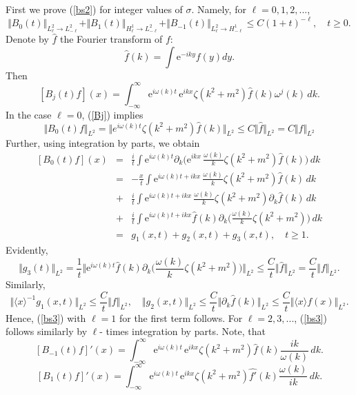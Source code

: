 \documentclass[reqno]{amsart}
\newcommand{\E}{\mathrm{e}}
\numberwithin{equation}{section}
\begin{document}
First we prove (\ref{bs2})  for integer  values of $\sigma$.  Namely, for $\ell=0,1,2,...$,
\begin{equation}\label{bs3}
\Vert B_0(t)\Vert_{L^2_{\ell}\to L^2_{-\ell}}
+\Vert B_1(t)\Vert_{H^1_{\ell}\to L^2_{-\ell}}+\Vert B_{-1}(t)\Vert_{L^2_{\ell}\to H^1_{-\ell}}
\le C(1+t)^{-\ell}\!,  \quad t\ge0.
\end{equation}
Denote by $\hat f$ the Fourier transform of $f$:
\[
\hat f(k)=\int \E^{-iky} f(y)dy.
\]
Then
\begin{equation}\label{Bj}
\!\!\!\!\![B_j(t)f](x)
=\int_{-\infty}^{\infty}\E^{i\omega(k)t}\,\E^{ikx}\zeta(k^2+m^2)\hat f(k)\omega^j(k)\,dk.
\end{equation}
In the case $\ell=0$, (\ref{Bj}) implies
$$
\Vert B_0(t)f\Vert_{L^2}=\Vert e^{i\omega(k)t}\zeta(k^2+m^2)\hat f(k)\Vert_{L^2}
\le C\Vert \hat f\Vert_{L^2} =C\Vert f\Vert_{L^2} 
$$
Further, using integration by parts, we obtain
\begin{eqnarray}\nonumber
[B_0(t)f](x)&\!\!=\!\!&\frac{i}{t}\int \E^{i\omega(k)t}\partial_k\Big(\E^{ikx}\,\frac{\omega(k)}{k}\zeta(k^2+m^2)\hat f(k)\Big)\,dk\\
\nonumber
&\!\!=\!\!&-\frac{x}{t}\int \E^{i\omega(k)t+ikx}\,\frac{\omega(k)}{k}\zeta(k^2+m^2)\hat f(k)\,dk\\
\nonumber
&\!\!+\!\!&\frac{i}{t}\int \E^{i\omega(k)t+ikx}\,\frac{\omega(k)}{k}\zeta(k^2+m^2)\partial_k\hat f(k)\,dk\\
\nonumber
&\!\!+\!\!&\frac{i}{t}\int \E^{i\omega(k)t+ikx}\hat f(k)\partial_k\Big(\frac{\omega(k)}{k}\zeta(k^2+m^2)\Big)\,dk\\
\label{in1}
&=&g_1(x,t)+g_2(x,t)+g_3(x,t),\quad t\ge 1.
\end{eqnarray}
Evidently,
$$
\Vert g_3(t)\Vert_{L^2}=\frac{1}{t}\Vert \E^{i\omega(k)t}\hat f(k)\partial_k\Big(\frac{\omega(k)}{k}\zeta(k^2+m^2)\Big)\Vert_{L^2}
\le \frac{C}{t}\Vert \hat f\Vert_{L^2} =\frac{C}{t}\Vert f\Vert_{L^2}. 
$$
Similarly,
$$
\Vert \langle x\rangle^{-1} g_1(x,t)\Vert_{L^2} \le \frac{C}{t}\Vert f\Vert_{L^2},\quad
\Vert g_2(x,t)\Vert_{L^2} \le \frac{C}{t}\Vert \partial_k\hat f(k)\Vert_{L^2}\le  \frac{C}{t}\Vert \langle x\rangle  f(x)\Vert_{L^2}.
$$
Hence, (\ref{bs3}) with $\ell=1$ for the first term follows.  For $\ell=2,3,...$, (\ref{bs3})  follows similarly by $\ell$- times integration by parts.
Note, that
$$
[B_{-1}(t)f]'(x) =\int_{-\infty}^{\infty}\E^{i\omega(k)t}\,\E^{ikx}\zeta(k^2+m^2)\hat f(k)\frac {ik}{\omega(k)}\,dk.
$$  
$$
[B_{1}(t)f]'(x) =\int_{-\infty}^{\infty}\E^{i\omega(k)t}\,\E^{ikx}\zeta(k^2+m^2)\widehat{ f'}(k)\frac {\omega(k)}{ik}\,dk.
$$   
\end{document}

